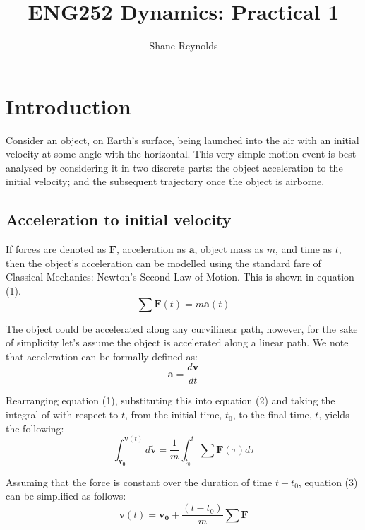 \documentclass[a4paper]{article}
\begin{document}
\title{ENG252 Dynamics: Practical 1}
\author{Shane Reynolds}
\maketitle

\section{Introduction}
Consider an object, on Earth's surface, being launched into the air with an initial velocity at some angle with the horizontal. This very simple motion event is best analysed by considering it in two discrete parts: the object acceleration to the initial velocity; and the subsequent trajectory once the object is airborne.

\subsection{Acceleration to initial velocity}
If forces are denoted as $\boldsymbol{F}$, acceleration as $\boldsymbol{a}$, object mass as $m$, and time as $t$, then the object's acceleration can be modelled using the standard fare of Classical Mechanics: Newton's Second Law of Motion. This is shown in equation (1).
\begin{equation}
\sum \boldsymbol{F}(t) = m \boldsymbol{a}(t)
\end{equation}

The object could be accelerated along any curvilinear path, however, for the sake of simplicity let's assume the object is accelerated along a linear path. We note that acceleration can be formally defined as:
\begin{equation}
\boldsymbol{a} = \frac{d\boldsymbol{v}}{dt}
\end{equation}

Rearranging equation (1), substituting this into equation (2) and taking the integral of with respect to $t$, from the initial time, $t_0$, to the final time, $t$, yields the following:
\begin{equation}
\int_{\boldsymbol{v_0}}^{\boldsymbol{v}(t)} d\tilde{\boldsymbol{v}} = \frac{1}{m}\int_{t_0}^{t} \sum \boldsymbol{F}(\tau) d\tau
\end{equation}

Assuming that the force is constant over the duration of time $t-t_0$, equation (3) can be simplified as follows:
\begin{equation}
\boldsymbol{v}(t) = \boldsymbol{v_0} + \frac{(t-t_0)}{m} \sum \boldsymbol{F} 
\end{equation}
\end{document}

